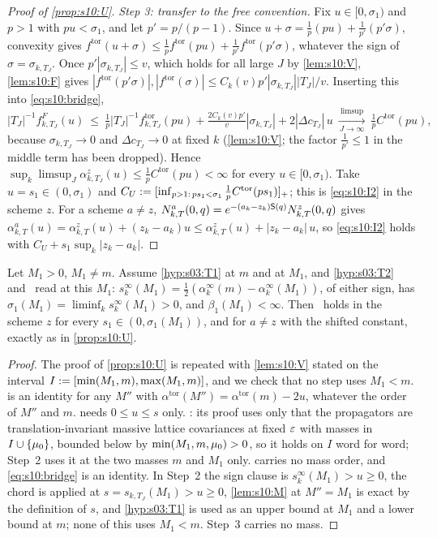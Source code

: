 \begin{proof}[Proof of \cref{prop:s10:U}]
\emph{Step 3: transfer to the free convention.} Fix $u\in[0,\sigma_1)$ and $p>1$ with $pu<\sigma_1$, and let $p'=p/(p-1)$. Since $u+\sigma=\frac1p(pu)+\frac1{p'}(p'\sigma)$, convexity gives $f^{\mathrm{tor}}(u+\sigma)\le\frac1pf^{\mathrm{tor}}(pu)+\frac1{p'}f^{\mathrm{tor}}(p'\sigma)$, whatever the sign of $\sigma=\sigma_{k,T_J}$. Once $p'|\sigma_{k,T_J}|\le v$, which holds for all large $J$ by \cref{lem:s10:V}, \cref{lem:s10:F} gives $|f^{\mathrm{tor}}(p'\sigma)|,|f^{\mathrm{tor}}(\sigma)|\le C_k(v)p'|\sigma_{k,T_J}||T_J|/v$. Inserting this into \eqref{eq:s10:bridge},
\[
|T_J|^{-1}f^F_{k,T_J}(u)\ \le\ \tfrac1p|T_J|^{-1}f^{\mathrm{tor}}_{k,T_J}(pu)+\tfrac{2C_k(v)p'}{v}|\sigma_{k,T_J}|+2|\Delta c_{T_J}|\,u
\ \xrightarrow[J\to\infty]{\ \limsup\ }\ \tfrac1pC^{\mathrm{tor}}(pu),
\]
because $\sigma_{k,T_J}\to0$ and $\Delta c_{T_J}\to0$ at fixed $k$ (\cref{lem:s10:V}; the factor $\frac1{p'}\le1$ in the middle term has been dropped). Hence $\sup_k\limsup_J\alpha^z_{k,T_J}(u)\le\frac1pC^{\mathrm{tor}}(pu)<\infty$ for every $u\in[0,\sigma_1)$. Take $u=s_1\in(0,\sigma_1)$ and $C_U:=[\inf_{p>1:\,ps_1<\sigma_1}\frac1pC^{\mathrm{tor}}(ps_1)]_+$; this is \eqref{eq:s10:I2} in the scheme $z$. For a scheme $a\ne z$, $N^a_{k,T}(0,q)=e^{-(a_k-z_k)\mathsf S(q)}N^z_{k,T}(0,q)$ gives $\alpha^a_{k,T}(u)=\alpha^z_{k,T}(u)+(z_k-a_k)u\le\alpha^z_{k,T}(u)+|z_k-a_k|\,u$, so \eqref{eq:s10:I2} holds with $C_U+s_1\sup_k|z_k-a_k|$.
\end{proof}

\begin{proposition}\label{prop:s10:Upm}
Let $M_1>0$, $M_1\ne m$. Assume \cref{hyp:s03:T1} at $m$ and at $M_1$, and \cref{hyp:s03:T2} and \Tthree\ read at this $M_1$: $s^\infty_k(M_1)=\frac12(\alpha^\infty_k(m)-\alpha^\infty_k(M_1))$, of either sign, has $\sigma_1(M_1)=\liminf_ks^\infty_k(M_1)>0$, and $\beta_1(M_1)<\infty$. Then \Itwo\ holds in the scheme $z$ for every $s_1\in(0,\sigma_1(M_1))$, and for $a\ne z$ with the shifted constant, exactly as in \cref{prop:s10:U}.
\end{proposition}

\begin{proof}
The proof of \cref{prop:s10:U} is repeated with \cref{lem:s10:V} stated on the interval $I:=[\min(M_1,m),\max(M_1,m)]$, and we check that no step uses $M_1<m$.  is an identity for any $M''$ with $\alpha^{\mathrm{tor}}(M'')=\alpha^{\mathrm{tor}}(m)-2u$, whatever the order of $M''$ and $m$.  needs $0\le u\le s$ only. : its proof uses only that the propagators are translation-invariant massive lattice covariances at fixed $\varepsilon$ with masses in $I\cup\{\mu_0\}$, bounded below by $\min(M_1,m,\mu_0)>0$, so it holds on $I$ word for word; Step~2 uses it at the two masses $m$ and $M_1$ only.  carries no mass order, and \eqref{eq:s10:bridge} is an identity. In Step~2 the sign clause is $s^\infty_k(M_1)>u\ge0$, the chord is applied at $s=s_{k,T_J}(M_1)>u\ge0$, \cref{lem:s10:M} at $M''=M_1$ is exact by the definition of $s$, and \cref{hyp:s03:T1} is used as an upper bound at $M_1$ and a lower bound at $m$; none of this uses $M_1<m$. Step~3 carries no mass.
\end{proof}

